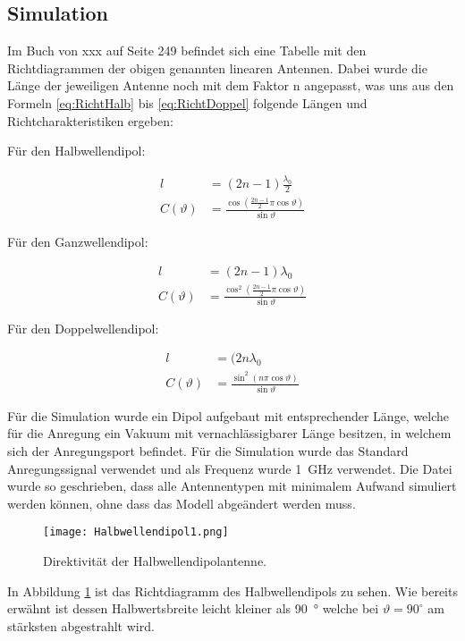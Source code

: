 \subsection{Simulation}

Im Buch von xxx auf Seite 249 befindet sich eine Tabelle mit den Richtdiagrammen der obigen genannten linearen Antennen. Dabei wurde die Länge der jeweiligen Antenne noch mit dem Faktor n angepasst, was uns aus den Formeln \ref{eq:RichtHalb} bis \ref{eq:RichtDoppel} folgende Längen und Richtcharakteristiken ergeben:

Für den Halbwellendipol:

\begin{align}
l &= (2n-1)\frac{\lambda_0}{2}\\
C(\vartheta) &= \frac{\cos \left(\frac{2n-1}{2}\pi \cos \vartheta \right)}{\sin \vartheta}
\end{align} 

Für den Ganzwellendipol:

\begin{align}
l &= (2n-1)\lambda_0\\
C(\vartheta) &= \frac{\cos^2 \left(\frac{2n-1}{2}\pi \cos \vartheta \right)}{\sin \vartheta}
\end{align} 

Für den Doppelwellendipol:

\begin{align}
l &= (2n\lambda_0\\
C(\vartheta) &= \frac{\sin^2 \left(n \pi \cos \vartheta \right)}{\sin \vartheta}
\end{align} 

Für die Simulation wurde ein Dipol aufgebaut mit entsprechender Länge, welche für die Anregung ein Vakuum mit vernachlässigbarer Länge besitzen, in welchem sich der Anregungsport befindet. Für die Simulation wurde das Standard Anregungssignal verwendet und als Frequenz wurde \SI{1}{\giga\hertz} verwendet. Die Datei wurde so geschrieben, dass alle Antennentypen mit minimalem Aufwand simuliert werden können, ohne dass das Modell abgeändert werden muss. 

\begin{figure}[!ht]
	\centering
    \texttt{[image: Halbwellendipol1.png]}
    \caption{Direktivität der Halbwellendipolantenne.}
    \label{fig:Halbwellendipol1}
\end{figure}

In Abbildung \ref{fig:Halbwellendipol1} ist das Richtdiagramm des Halbwellendipols zu sehen. Wie bereits erwähnt ist dessen Halbwertsbreite leicht kleiner als \SI{90}{\degree} welche bei $\vartheta = 90^\circ$ am stärksten abgestrahlt wird.

